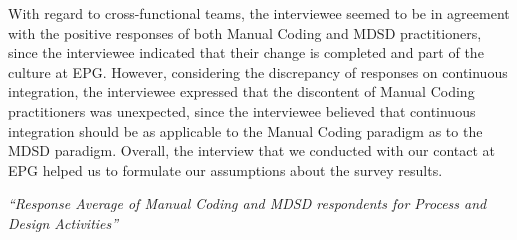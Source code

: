 \documentclass[final_report_innit.tex]{subfiles}
\begin{document}
With regard to cross-functional teams, the interviewee seemed to be in agreement with the positive responses of both Manual Coding and MDSD practitioners, since the interviewee indicated that their change is completed and part of the culture at EPG. However, considering the discrepancy of responses on continuous integration, the interviewee expressed that the discontent of Manual Coding practitioners was unexpected, since the interviewee believed that continuous integration should be as applicable to the Manual Coding paradigm as to the MDSD paradigm. Overall, the interview that we conducted with our contact at EPG helped us to formulate our assumptions about the survey results. 
\\

\textit{``Response Average of Manual Coding and MDSD respondents for Process and Design Activities''}
\end{document}
